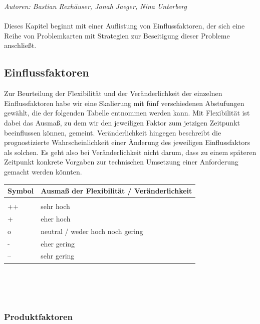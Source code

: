 \documentclass[enabledeprecatedfontcommands,fontsize=11pt,paper=a4,twoside]{scrartcl}
\newcounter{one}
\begin{document}
\emph{Autoren: Bastian Rexhäuser, Jonah Jaeger, Nina Unterberg}\\ \\
Dieses Kapitel beginnt mit einer Auflistung von Einflussfaktoren, der sich eine Reihe von Problemkarten mit Strategien zur Beseitigung dieser Probleme anschließt.
\subsection{Einflussfaktoren}
\label{sec:einflussfaktoren}

Zur Beurteilung der Flexibilität und der Veränderlichkeit der einzelnen Einflussfaktoren habe wir eine Skalierung mit fünf verschiedenen Abstufungen gewählt, die der folgenden Tabelle entnommen werden kann. Mit Flexibilität ist dabei das Ausmaß, zu dem wir den jeweiligen Faktor zum jetzigen Zeitpunkt beeinflussen können, gemeint. Veränderlichkeit hingegen beschreibt die prognostizierte Wahrscheinlichkeit einer Änderung des jeweiligen Einflussfaktors als solchen. Es geht also bei Veränderlichkeit nicht darum, dass zu einem späteren Zeitpunkt konkrete Vorgaben zur technischen Umsetzung einer Anforderung gemacht werden könnten. \\

\begin{tabular}{p{2cm}p{8cm}}
	Symbol & Ausmaß der Flexibilität / Veränderlichkeit \\ \hline \\
	++ & sehr hoch \\ 
	+ & eher hoch \\ 
	o & neutral / weder hoch noch gering \\ 
	- & eher gering \\ 
	-- & sehr gering \\ 
\end{tabular}\\ \\ \\




\newpage
\def\arraystretch{1.5}
\subsubsection{Produktfaktoren}
\setcounter{one}{1}
\end{document}
